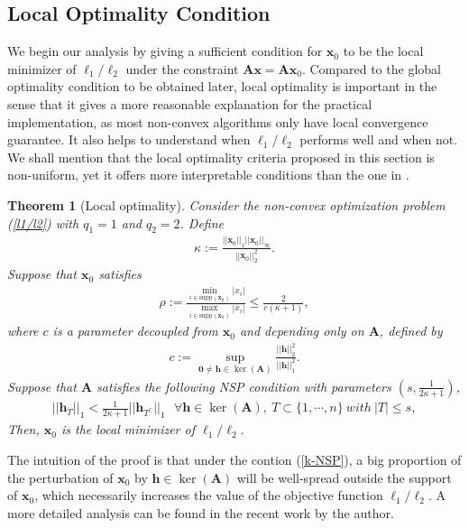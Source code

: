 \documentclass[11pt]{article}
\numberwithin{equation}{section}
\theoremstyle{plain}
\newtheorem{Th}{Theorem}[section]
\theoremstyle{definition}
\def\A{{\mathbf A}}
\def\x{{\mathbf x}}
\def\h{{\mathbf{h}}}
\begin{document}
\subsection{Local Optimality Condition}

We begin our analysis by giving a sufficient condition for $\x_0$ to be the local minimizer of $\ell_1/\ell_2$ under the constraint $\A\x=\A\x_0$. Compared to the global optimality condition to be obtained later, local optimality is important in the sense that it gives a more reasonable explanation for the practical implementation, as most non-convex algorithms only have local convergence guarantee. It also helps to understand when $\ell_1/\ell_2$ performs well and when not. We shall mention that the local optimality criteria proposed in this section is non-uniform, yet it offers more interpretable conditions than the one in \cite{rahimi2018scale}.

\begin{Th}[Local optimality]\label{T:local}
Consider the non-convex optimization problem (\ref{l1/l2}) with $q_1=1$ and $q_2=2$. Define
\begin{align}
\kappa:=\frac{||\x_0||_1||\x_0||_\infty}{||\x_0||^2_2}.\label{kappa}
\end{align}
Suppose that $\x_0$ satisfies  
\begin{align}
\rho:=\frac{\min_{i\in\text{supp}(\x_0)}|x_i|}{\max_{i\in\text{supp}(\x_0)}|x_i|}\leq\frac{2}{c(\kappa+1)},\label{ratio}
\end{align}
where $c$ is a parameter decoupled from $\x_0$ and depending only on $\A$, defined by 
\begin{align*}
c:=\sup_{\mathbf{0}\neq \h\in\ker(\A)}\frac{||\h||^2_2}{||\h||_1^2}.
\end{align*}
Suppose that $\A$ satisfies the following NSP condition with parameters $(s, \frac{1}{2\kappa+1})$, 
\begin{align}
||\h_T||_1<\frac{1}{2\kappa+1}||\h_{T^\complement}||_1\ \ \ \forall\h\in \ker(\A), \ T\subset\{1, \cdots, n\}\ with\ |T|\leq s,\label{k-NSP}
\end{align}
Then, $\x_0$ is the local minimizer of $\ell_1/\ell_2$.   
\end{Th}

The intuition of the proof is that under the contion (\ref{k-NSP}), a big proportion of the perturbation of $\x_0$ by $\h\in\ker(\A)$ will be well-spread outside the support of $\x_0$, which necessarily increases the value of the objective function $\ell_1/\ell_2$. A more detailed analysis can be found in the recent work by the author. 
\end{document}
